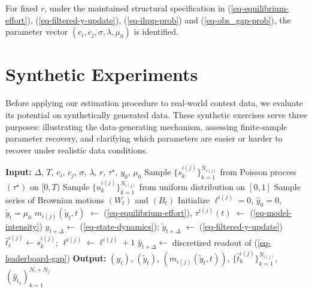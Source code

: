 \documentclass[mnsc]{informs3}
\begin{document}
\begin{lemma}
\label{lmm-params-identifiability}
For fixed $r$, under the maintained structural specification in (\ref{eq-equilibrium-effort}), (\ref{eq-filtered-y-update}), (\ref{eq-ihpp-prob}) and (\ref{eq-obs_gap-prob}), the parameter vector $(c_i,c_j,\sigma,\lambda,\mu_0)$ is identified.
\end{lemma}


\section{Synthetic Experiments}\label{sect-synthetic}

Before applying our estimation procedure to real-world contest data, we evaluate its potential on synthetically generated data.
These synthetic exercises serve three purposes: illustrating the data-generating mechanism, assessing finite-sample parameter recovery, and clarifying which parameters are easier or harder to recover under realistic data conditions.

\begin{algorithm}[!ht]
\caption{Synthetic Data Simulation}
\label{algo-dgp}
\begin{algorithmic}
\STATE \textbf{Input:}
	$\Delta$, $T$, $c_i$, $c_j$, $\sigma$, $\lambda$, $r$, $\tau^\star$, $y_0$, $\mu_0$
\STATE Sample $\{s_k^{i(j)}\}^{N_{i(j)}}_{k=1}$ from Poisson process $(\tau^\star)$ on $[0, T)$
\STATE Sample $\{u_k^{i(j)}\}^{N_{i(j)}}_{k=1}$ from uniform distribution on $[0, 1]$
\STATE Sample series of Brownian motions $(W_t)$ and $(B_t)$
\STATE Initialize $\ell^{i(j)}=0$, $\hat{y}_0 = 0$, $\tilde{y}_t=\mu_0$
    \STATE $m_{i(j)}(\tilde{y}_t, t)$  $\gets$ (\ref{eq-equilibrium-effort}), $\tau^{i(j)}(t)$ $\gets$ (\ref{eq-model-intensity})
    \hfill {}
    \STATE $y_{t+\Delta} \gets$ (\ref{eq-state-dynamics}); $\tilde{y}_{t+\Delta}$ $\gets$ (\ref{eq-filtered-y-update})
    \hfill {}
    \FOR{$s_{k}^{i(j)} \in [t, t+\Delta)$}
        	    \STATE $\hat{t}^{i(j)}_{\ell} \gets s_{k}^{i(j)}$; $\ell^{i(j)} \gets \ell^{i(j)}+1$
	    \hfill {}
	    \STATE $\hat{y}_{t+\Delta} \gets $ discretized readout of (\ref{eq-leaderboard-gap})
	    \hfill {}
        \ENDIF
    \ENDFOR
\ENDFOR
\STATE \textbf{Output:} $(y_t)$, $(\tilde{y}_t)$, $(m_{i(j)}(\tilde{y}_t, t))$, $\{\hat{t}_k^{i(j)}\}^{N_{i(j)}}_{k=1}$, $(\hat{y}_{t_k})_{k=1}^{N_i + N_j}$
\end{algorithmic}
\end{algorithm}
\end{document}
